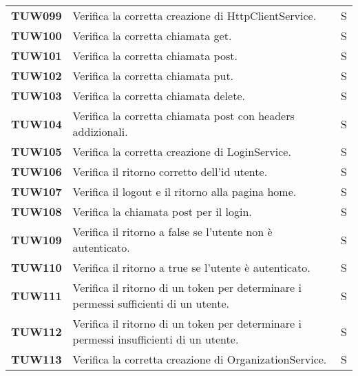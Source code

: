 \documentclass[../../piano-di-qualifica.tex]{subfiles}
\begin{document}
\begin{longtable}[H]{>{\centering\bfseries}m{3cm} >{}m{10cm} >{\centering\arraybackslash}m{3cm}}

TUW099             & Verifica la corretta creazione di HttpClientService. & S \\ 

TUW100             & Verifica la corretta chiamata get. & S \\ 

TUW101             & Verifica la corretta chiamata post. & S \\ 

TUW102             & Verifica la corretta chiamata put. & S \\ 

TUW103             & Verifica la corretta chiamata delete. & S \\ 

TUW104             & Verifica la corretta chiamata post con headers addizionali. & S \\ 


TUW105             & Verifica la corretta creazione di LoginService. & S \\ 

TUW106             & Verifica il ritorno corretto dell'id utente. & S \\ 
 
TUW107             & Verifica il logout e il ritorno alla pagina home. & S \\ 

TUW108             & Verifica la chiamata post per il login. & S \\ 

TUW109             & Verifica il ritorno a false se l'utente non è autenticato. & S \\ 

TUW110             & Verifica il ritorno a true se l'utente è autenticato. & S \\ 

TUW111             & Verifica il ritorno di un token per determinare i permessi sufficienti di un utente. & S \\ 

TUW112             & Verifica il ritorno di un token per determinare i permessi insufficienti di un utente. & S \\ 



TUW113             & Verifica la corretta creazione di OrganizationService. & S \\ 


\end{longtable}
\end{document}
